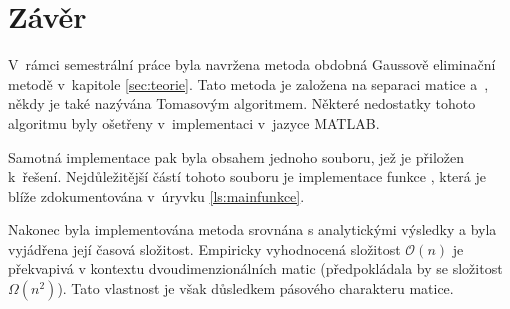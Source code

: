 \documentclass[12pt]{CLASS/protokol}
\begin{document}
\section{Závěr}
    V~rámci semestrální práce byla navržena metoda obdobná Gaussově eliminační metodě v~kapitole \ref{sec:teorie}. Tato metoda je založena na separaci matice  a~, někdy je také nazývána Tomasovým algoritmem. Některé nedostatky tohoto algoritmu byly ošetřeny v~implementaci v~jazyce MATLAB.
    \par
    Samotná implementace pak byla obsahem jednoho souboru, jež je přiložen k~řešení. Nejdůležitější částí tohoto souboru je implementace funkce , která je blíže zdokumentována v~úryvku \ref{ls:mainfunkce}.
    \par
    Nakonec byla implementována metoda srovnána s analytickými výsledky a byla vyjádřena její časová složitost. Empiricky vyhodnocená složitost $\mathcal{O}(n)$ je překvapivá v kontextu dvoudimenzionálních matic (předpokládala by se složitost $\Omega(n^2)$). Tato vlastnost je však důsledkem pásového charakteru matice.

\printbibliography
\end{document}
